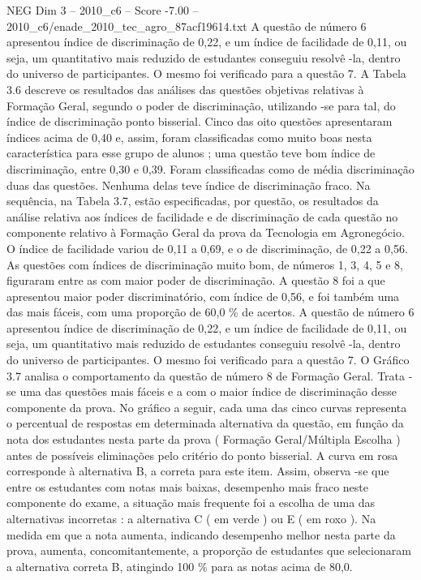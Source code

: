 \begin{textsample}{NEG Dim 3 – 2010\_c6 – Score -7.00 – 2010\_c6/enade\_2010\_tec\_agro\_87acf19614.txt}
A questão de número 6 apresentou índice de discriminação de 0,22, e um índice de facilidade de 0,11, ou seja, um quantitativo mais reduzido de estudantes conseguiu resolvê -la, dentro do universo de participantes.
O mesmo foi verificado para a questão 7.
A Tabela 3.6 descreve os resultados das análises das questões objetivas relativas à Formação Geral, segundo o poder de discriminação, utilizando -se para tal, do índice de discriminação ponto bisserial.
Cinco das oito questões apresentaram índices acima de 0,40 e, assim, foram classificadas como muito boas nesta característica para esse grupo de alunos ; uma questão teve bom índice de discriminação, entre 0,30 e 0,39.
Foram classificadas como de média discriminação duas das questões.
Nenhuma delas teve índice de discriminação fraco.
Na sequência, na Tabela 3.7, estão especificadas, por questão, os resultados da análise relativa aos índices de facilidade e de discriminação de cada questão no componente relativo à Formação Geral da prova da Tecnologia em Agronegócio.
O índice de facilidade variou de 0,11 a 0,69, e o de discriminação, de 0,22 a 0,56.
As questões com índices de discriminação muito bom, de números 1, 3, 4, 5 e 8, figuraram entre as com maior poder de discriminação.
A questão 8 foi a que apresentou maior poder discriminatório, com índice de 0,56, e foi também uma das mais fáceis, com uma proporção de 60,0 \% de acertos.
A questão de número 6 apresentou índice de discriminação de 0,22, e um índice de facilidade de 0,11, ou seja, um quantitativo mais reduzido de estudantes conseguiu resolvê -la, dentro do universo de participantes.
O mesmo foi verificado para a questão 7.
O Gráfico 3.7 analisa o comportamento da questão de número 8 de Formação Geral.
Trata -se uma das questões mais fáceis e a com o maior índice de discriminação desse componente da prova.
No gráfico a seguir, cada uma das cinco curvas representa o percentual de respostas em determinada alternativa da questão, em função da nota dos estudantes nesta parte da prova ( Formação Geral/Múltipla Escolha ) antes de possíveis eliminações pelo critério do ponto bisserial.
A curva em rosa corresponde à alternativa B, a correta para este item.
Assim, observa -se que entre os estudantes com notas mais baixas, desempenho mais fraco neste componente do exame, a situação mais frequente foi a escolha de uma das alternativas incorretas : a alternativa C ( em verde ) ou E ( em roxo ).
Na medida em que a nota aumenta, indicando desempenho melhor nesta parte da prova, aumenta, concomitantemente, a proporção de estudantes que selecionaram a alternativa correta B, atingindo 100 \% para as notas acima de 80,0.

\end{textsample}
